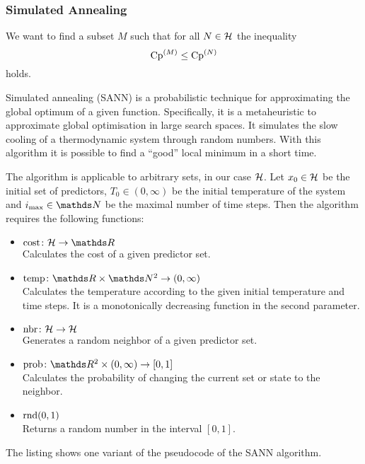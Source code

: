 		\subsubsection{Simulated Annealing}
		\label{sssec:simulated-annealing}
	
			We want to find a subset $M$ such that for all $N\in\mathcal{H}$ the inequality
			\[
				\mathrm{Cp}^{(M)} \leq \mathrm{Cp}^{(N)}
			\]
			holds.

			Simulated annealing (SANN) is a probabilistic technique for approximating the global optimum of a given function.
			Specifically, it is a metaheuristic to approximate global optimisation in large search spaces.
			It simulates the slow cooling of a thermodynamic system through random numbers.
			With this algorithm it is possible to find a \enquote{good} local minimum in a short time.

			The algorithm is applicable to arbitrary sets, in our case $\mathcal{H}$.
			Let $x_0\in\mathcal{H}$ be the initial set of predictors, $T_0\in(0,\infty)$ be the initial temperature of the system and $i_\m{max}\in\SN$ be the maximal number of time steps.
			Then the algorithm requires the following functions:
			\begin{itemize}
				\item $\func{\m{cost}}{\s{H}}{\SR}$ \\
					Calculates the cost of a given predictor set.
				\item $\func{\m{temp}}{\SR\times\SN^2}{(0,\infty)}$\\
					Calculates the temperature according to the given initial temperature and time steps.
					It is a monotonically decreasing function in the second parameter.
				\item $\mathrm{nbr}\colon\mathcal{H}\to\mathcal{H}$ \\
					Generates a random neighbor of a given predictor set.
				\item $\func{\m{prob}}{\SR^2\times(0,\infty)}{[0,1]}$ \\
					Calculates the probability of changing the current set or state to the neighbor.
				\item $\mathrm{rnd}(0,1)$ \\
					Returns a random number in the interval $[0,1]$.
			\end{itemize}
			The listing shows one variant of the pseudocode of the SANN algorithm. 

